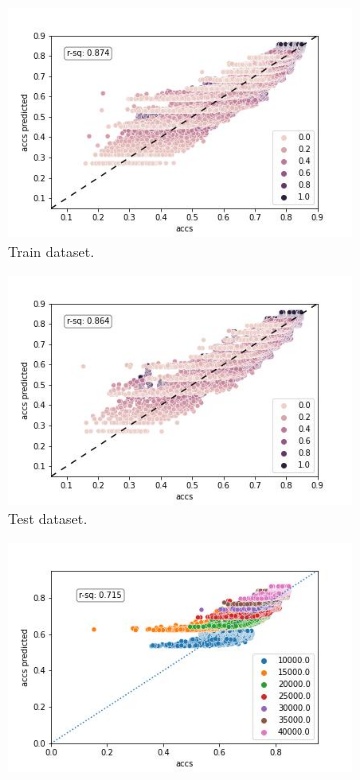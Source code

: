 \documentclass{article} %
\begin{document}
\begin{figure}
    \begin{subfigure}{.33\textwidth}
        \centering
        \includegraphics[width=.8\linewidth]{cifar10/powerlaw_all_epochs_accs_hat_total_n_epoch.jpg}
        \caption{Train dataset.}
        \label{fig:powerlaw_acc_total_n_epoch_train}
    \end{subfigure}%
    \begin{subfigure}{.33\textwidth}
        \centering
        \includegraphics[width=.8\linewidth]{cifar10/powerlaw_all_epochs_accs_hat_total_n_epoch_val.jpg}
        \caption{Test dataset.}
        \label{fig:powerlaw_acc_total_n_epoch_val}
    \end{subfigure}
    \begin{subfigure}{.33\textwidth}
        \centering
        \includegraphics[width=.8\linewidth]{cifar10/powerlaw_all_epochs_accs_hat_total_n_epoch_val_forward_testing.jpg}

\end{subfigure}
\end{figure}
\end{document}

